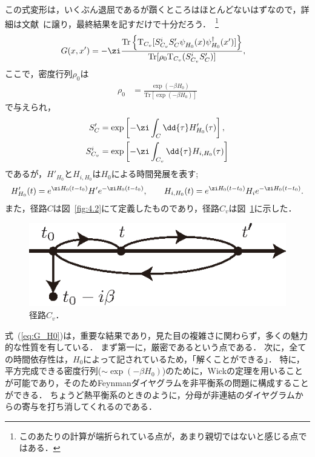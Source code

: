 \documentclass[a4paper,10pt]{jsarticle}
\begin{document}
この式変形は，いくぶん退屈であるが躓くところはほとんどないはずなので，詳細は文献~\cite{RammerRMP}に譲り，最終結果を記すだけで十分だろう．~\footnote{{\color{red} このあたりの計算が端折られている点が，あまり親切ではないと感じる点ではある．}}
\begin{align}
G (x, x')
	& = - \zi \frac{ \mathrm{Tr} \left\{ \mathrm{T}_{C_v} [ S_{C_v}^i S'_{C} \psi^{}_{H_0} (x) \psi^{\dagger}_{H_0} (x') ] \right\} }%
		{ \mathrm{Tr} [ \rho_0 \mathrm{T}_{C_v} ( S_{C_v}^i S'_{C} ) ] }
\label{eq:G_H0}
,\end{align}
ここで，密度行列$\rho_0$は
\begin{align}
\rho_0
	& = \frac{\exp (- \beta H_0)}{\mathrm{Tr} [ \exp (- \beta H_0) ]}
\end{align}
で与えられ，
\begin{align}
S'_{C}
	& = \exp \left[ - \zi \int_{C} \dd{\tau} H'_{H_0} (\tau) \right]
\notag
, \\
S_{C_v}^i
	& = \exp \left[ - \zi \int_{C_v} \dd{\tau} H_{i, H_0} (\tau) \right]
\end{align}
であるが，$H'_{H_0}$と$H_{i, H_0}$は$H_0$による時間発展を表す;
\begin{align*}
H'_{H_0} (t)
	= e^{\zi H_0 (t - t_0)} H' e^{- \zi H_0 (t - t_0)}
, \qquad
H_{i, H_0} (t)
	= e^{\zi H_0 (t - t_0)} H_i e^{- \zi H_0 (t - t_0)}
.\end{align*}
また，径路$C$は図~\ref{fig:4.2}にて定義したものであり，径路$C_v$は図~\ref{fig:4.3}に示した．
\begin{figure}[thbp]
\centering
\includegraphics[width=0.5\linewidth]{4.3.eps}
\caption{\label{fig:4.3}径路$C_v$．}
\end{figure}

式~(\ref{eq:G_H0})は，重要な結果であり，見た目の複雑さに関わらず，多くの魅力的な性質を有している．
まず第一に，厳密であるという点である．
次に，全ての時間依存性は，$H_0$によって記されているため，「解くことができる」．
特に，平方完成できる密度行列($\sim \exp( - \beta H_0)$)のために，Wickの定理を用いることが可能であり，そのためFeynmanダイヤグラムを非平衡系の問題に構成することができる．
ちょうど熱平衡系のときのように，分母が非連結のダイヤグラムからの寄与を打ち消してくれるのである．
\end{document}
